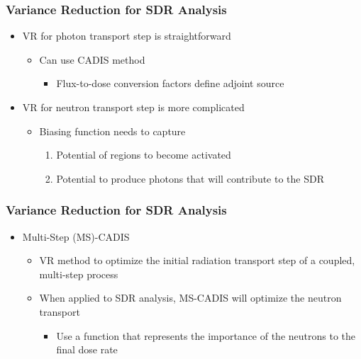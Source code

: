 \documentclass{beamer}
\begin{document}
\begin{frame}
\frametitle{Variance Reduction for SDR Analysis}
\begin{itemize}
\item{VR for photon transport step is straightforward}
  \begin{itemize}
  \item{Can use CADIS method}
    \begin{itemize}
    \item{Flux-to-dose conversion factors define adjoint source}
    \end{itemize}
  \end{itemize}
\item{VR for neutron transport step is more complicated}
    \begin{itemize}
    \item{Biasing function needs to capture}
      \begin{enumerate}
        \item{Potential of regions to become activated}
        \item{Potential to produce photons that will contribute to the SDR}
      \end{enumerate}
    \end{itemize}
\end{itemize}
\end{frame}


\begin{frame}
\frametitle{Variance Reduction for SDR Analysis}
\begin{itemize}
\item{Multi-Step (MS)-CADIS}
  \begin{itemize}
  \item {VR method to optimize the initial radiation transport step of a coupled, multi-step process}
  \item{When applied to SDR analysis, MS-CADIS will optimize the neutron transport}
    \begin{itemize}
    \item{Use a function that represents the   importance of the neutrons to the final dose rate}
    \end{itemize}
  \end{itemize}
\end{itemize}
\end{frame}
\end{document}
